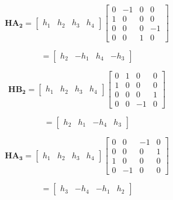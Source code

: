 \documentclass[fleqn]{article}
\begin{document}
\begin{enumerate}
\begin{enumerate}
			\begin{equation*}
				\mathbf{HA_2} = \begin{bmatrix}
					h_1 & h_2 & h_3 & h_4
				\end{bmatrix}\begin{bmatrix}
					0 & -1 & 0 &  0 \\
					1 &  0 & 0 &  0 \\
					0 &  0 & 0 & -1 \\
					0 &  0 & 1 &  0
				\end{bmatrix}
			\end{equation*}
			
			\begin{equation*}
				= \begin{bmatrix}
					h_2 & -h_1 & h_4 & -h_3
				\end{bmatrix}
			\end{equation*}
			
			\begin{equation*}
				\mathbf{HB_2} = \begin{bmatrix}
					h_1 & h_2 & h_3 & h_4
				\end{bmatrix}\begin{bmatrix}
					0 & 1 &  0 & 0 \\
					1 & 0 &  0 & 0 \\
					0 & 0 &  0 & 1 \\
					0 & 0 & -1 & 0
				\end{bmatrix}
			\end{equation*}
			
			\begin{equation*}
				= \begin{bmatrix}
					h_2 & h_1 & -h_4 & h_3
				\end{bmatrix}
			\end{equation*}
			
			\begin{equation*}
				\mathbf{HA_3} = \begin{bmatrix}
					h_1 & h_2 & h_3 & h_4
				\end{bmatrix}\begin{bmatrix}
					0 &  0 & -1 & 0 \\
					0 &  0 &  0 & 1 \\
					1 &  0 &  0 & 0 \\
					0 & -1 &  0 & 0
				\end{bmatrix}
			\end{equation*}
			
			\begin{equation*}
				= \begin{bmatrix}
					h_3 & -h_4 & -h_1 & h_2
				\end{bmatrix}
			\end{equation*}
			

\end{enumerate}
\end{enumerate}
\end{document}
